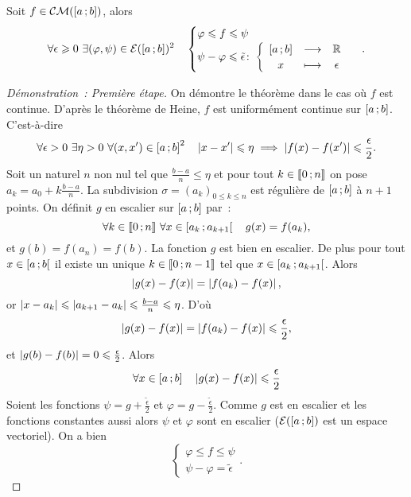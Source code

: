 \begin{theo}
  Soit $f \in \mathcal{CM}(\left[ a \, ;  b \right])$, alors
  \begin{equation}
    \forall \epsilon \geqslant 0 \ \exists (\varphi, \psi) \in \mathcal{E}(\left[ a \, ;  b \right])^2 \quad \begin{cases} \varphi \leqslant f \leqslant \psi \\ \psi-\varphi \leqslant \tilde{\epsilon}\colon \left\{\begin{array}{ccc} \left[ a \, ;  b \right] & \longrightarrow &\mathbb{R}\\ x & \longmapsto & \epsilon \end{array} \right. \end{cases}.
  \end{equation}
\end{theo}
\begin{proof}[Démonstration~: Première étape]
  On démontre le théorème dans le cas où $f$ est continue. D'après le théorème de Heine, $f$ est uniformément continue sur $\left[ a \, ;  b \right]$. C'est-à-dire
  \begin{equation}
    \forall \epsilon >0 \ \exists \eta>0 \ \forall (x,x') \in \intervalleff{a}{b}^2 \quad \abs{x-x'} \leqslant \eta \implies \abs{f(x)-f(x')} \leqslant \frac{\epsilon}{2}.
  \end{equation}
  Soit un naturel $n$ non nul tel que $\frac{b-a}{n} \leqslant \eta$ et pour tout $k \in \mathopen{\llbracket}0\mathclose{}\mathpunct{};n\mathclose{\rrbracket}$ on pose $a_k=a_0+k \frac{b-a}{n}$. La subdivision $\sigma=(a_k)_{0 \leqslant k \leqslant n}$ est régulière de $\left[ a \, ;  b \right]$ à $n+1$ points. On définit $g$ en escalier sur $\left[ a \, ;  b \right]$ par~:
  \begin{equation}
    \forall k \in \mathopen{\llbracket}0\mathclose{}\mathpunct{};n\mathclose{\rrbracket} \ \forall x \in \left[ a_k \, ;  a_{k+1} \right[ \quad g(x)=f(a_k),
  \end{equation}
  et $g(b)=f(a_n)=f(b)$. La fonction $g$ est bien en escalier. De plus pour tout $x \in \left[ a \, ;  b \right[$ il existe un unique $k \in \mathopen{\llbracket}0\mathclose{}\mathpunct{};n-1\mathclose{\rrbracket}$ tel que $x \in \left[ a_k \, ;  a_{k+1} \right[$.  Alors
  \begin{equation}
    \left\lvert g(x)-f(x)\right\rvert = \left\lvert f(a_k)-f(x)\right\rvert,
  \end{equation}
  or $\left\lvert x-a_k\right\rvert \leqslant \left\lvert a_{k+1}-a_k\right\rvert \leqslant \frac{b-a}{n}\leqslant \eta$. D'où
  \begin{equation}
    \left\lvert g(x)-f(x)\right\rvert = \left\lvert f(a_k)-f(x)\right\rvert \leqslant \frac{\epsilon}{2},
  \end{equation}
  et $\left\lvert g(b)-f(b)\right\rvert=0 \leqslant \frac{\epsilon}{2}$. Alors
  \begin{equation}
    \forall x \in \left[ a \, ;  b \right] \quad \left\lvert g(x)-f(x)\right\rvert \leqslant \frac{\epsilon}{2}
  \end{equation}
  Soient les fonctions $\psi=g + \frac{\tilde{\epsilon}}{2}$ et $\varphi=g - \frac{\tilde{\epsilon}}{2}$. Comme $g$ est en escalier et les fonctions constantes aussi alors $\psi$ et $\varphi$ sont en escalier ($\mathcal{E}(\left[ a \, ;  b \right])$ est un espace vectoriel). On a bien
  \begin{equation}
    \begin{cases}
      \varphi \leqslant f \leqslant \psi \\
      \psi-\varphi=\tilde{\epsilon}
    \end{cases}.
  \end{equation}


\end{proof}
